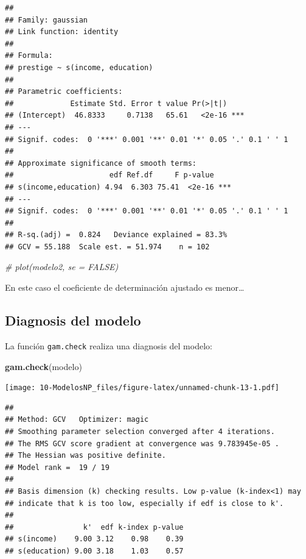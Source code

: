 \documentclass[]{book}
\newenvironment{Shaded}{\begin{snugshade}}{\end{snugshade}}
\newcommand{\KeywordTok}[1]{\textcolor[rgb]{0.13,0.29,0.53}{\textbf{#1}}}
\newcommand{\CommentTok}[1]{\textcolor[rgb]{0.56,0.35,0.01}{\textit{#1}}}
\newcommand{\NormalTok}[1]{#1}
\begin{document}
\begin{verbatim}
## 
## Family: gaussian 
## Link function: identity 
## 
## Formula:
## prestige ~ s(income, education)
## 
## Parametric coefficients:
##             Estimate Std. Error t value Pr(>|t|)    
## (Intercept)  46.8333     0.7138   65.61   <2e-16 ***
## ---
## Signif. codes:  0 '***' 0.001 '**' 0.01 '*' 0.05 '.' 0.1 ' ' 1
## 
## Approximate significance of smooth terms:
##                      edf Ref.df     F p-value    
## s(income,education) 4.94  6.303 75.41  <2e-16 ***
## ---
## Signif. codes:  0 '***' 0.001 '**' 0.01 '*' 0.05 '.' 0.1 ' ' 1
## 
## R-sq.(adj) =  0.824   Deviance explained = 83.3%
## GCV = 55.188  Scale est. = 51.974    n = 102
\end{verbatim}

\begin{Shaded}
\begin{Highlighting}[]
\CommentTok{# plot(modelo2, se = FALSE)}
\end{Highlighting}
\end{Shaded}

En este caso el coeficiente de determinación ajustado es menor\ldots{}

\subsection{Diagnosis del modelo}\label{diagnosis-del-modelo-2}

La función \texttt{gam.check} realiza una diagnosis del modelo:

\begin{Shaded}
\begin{Highlighting}[]
\KeywordTok{gam.check}\NormalTok{(modelo)}
\end{Highlighting}
\end{Shaded}

\texttt{[image: 10-ModelosNP\_files/figure-latex/unnamed-chunk-13-1.pdf]}

\begin{verbatim}
## 
## Method: GCV   Optimizer: magic
## Smoothing parameter selection converged after 4 iterations.
## The RMS GCV score gradient at convergence was 9.783945e-05 .
## The Hessian was positive definite.
## Model rank =  19 / 19 
## 
## Basis dimension (k) checking results. Low p-value (k-index<1) may
## indicate that k is too low, especially if edf is close to k'.
## 
##                k'  edf k-index p-value
## s(income)    9.00 3.12    0.98    0.39
## s(education) 9.00 3.18    1.03    0.57
\end{verbatim}
\end{document}
